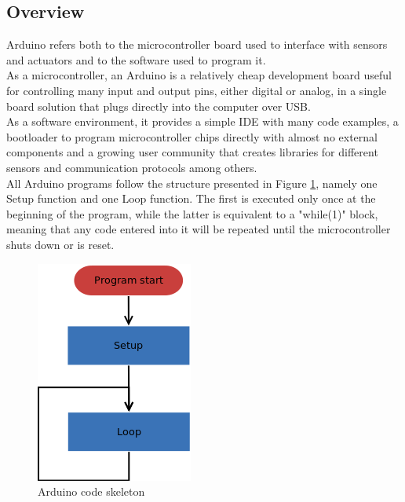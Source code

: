 \subsection{Overview}
Arduino refers both to the microcontroller board used to interface with sensors and actuators and to the software used to program it.\\

As a microcontroller, an Arduino is a relatively cheap development board useful for controlling many input and output pins, either digital or analog, in a single board solution that plugs directly into the computer over USB.\\

As a software environment, it provides a simple IDE with many code examples, a bootloader to program microcontroller chips directly with almost no external components and a growing user community that creates libraries for different sensors and communication protocols among others.\\

All Arduino programs follow the structure presented in Figure \ref{arduinoSkeleton}, namely one Setup function and one Loop function. The first is executed only once at the beginning of the program, while the latter is equivalent to a "while(1)" block, meaning that any code entered into it will be repeated until the microcontroller shuts down or is reset.\\

\begin{figure}[H]
      \centering
      \includegraphics[scale=.8]{images/Diagrams/arduinoSkeleton.png}
      \caption{Arduino code skeleton }
      \label{arduinoSkeleton}
\end{figure}
\bigskip



\newpage
